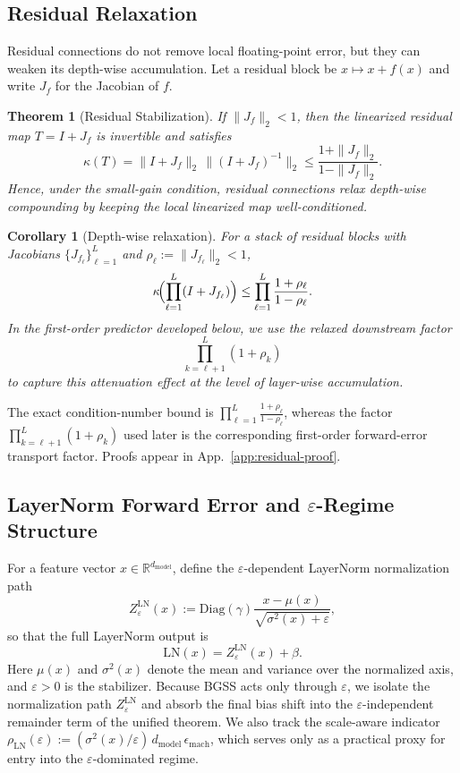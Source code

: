 \documentclass[twoside]{article}
\newtheorem{theorem}{Theorem}
\newtheorem{corollary}{Corollary}
\theoremstyle{definition}
\theoremstyle{remark}
\begin{document}
\subsection{Residual Relaxation}
\label{subsec:residual}

Residual connections do not remove local floating-point error, but they can
weaken its depth-wise accumulation. Let a residual block be $x \mapsto x + f(x)$
and write $J_f$ for the Jacobian of $f$.

\begin{theorem}[Residual Stabilization]
\label{thm:residual}
If $\|J_f\|_2 < 1$, then the linearized residual map $T = I + J_f$ is invertible and satisfies
\[
\kappa(T)
=
\|I+J_f\|_2\,\|(I+J_f)^{-1}\|_2
\le
\frac{1+\|J_f\|_2}{1-\|J_f\|_2}.
\]
Hence, under the small-gain condition, residual connections relax depth-wise compounding by
keeping the local linearized map well-conditioned.
\end{theorem}

\begin{corollary}[Depth-wise relaxation]
\label{cor:depth}
For a stack of residual blocks with Jacobians $\{J_{f_\ell}\}_{\ell=1}^L$ and
$\rho_\ell := \|J_{f_\ell}\|_2 < 1$,
\[
\kappa\!\Bigl(\prod_{\ell=1}^L (I+J_{f_\ell})\Bigr)
\le
\prod_{\ell=1}^L \frac{1+\rho_\ell}{1-\rho_\ell}.
\]
In the first-order predictor developed below, we use the relaxed downstream factor
\[
\prod_{k=\ell+1}^L (1+\rho_k)
\]
to capture this attenuation effect at the level of layer-wise accumulation.
\end{corollary}

The exact condition-number bound is
$\prod_{\ell=1}^L \frac{1+\rho_\ell}{1-\rho_\ell}$, whereas the factor
$\prod_{k=\ell+1}^L (1+\rho_k)$ used later is the corresponding first-order
forward-error transport factor. Proofs appear in
App.~\ref{app:residual-proof}.

\subsection{LayerNorm Forward Error and \texorpdfstring{$\varepsilon$}{epsilon}-Regime Structure}
\label{subsec:ln}

For a feature vector $x \in \mathbb{R}^{d_{\mathrm{model}}}$, define the
$\varepsilon$-dependent LayerNorm normalization path
\[
Z^{\mathrm{LN}}_\varepsilon(x)
:=
\mathrm{Diag}(\gamma)\frac{x-\mu(x)}{\sqrt{\sigma^2(x)+\varepsilon}},
\]
so that the full LayerNorm output is
\[
\mathrm{LN}(x)=Z^{\mathrm{LN}}_\varepsilon(x)+\beta.
\]
Here $\mu(x)$ and $\sigma^2(x)$ denote the mean and variance over the normalized
axis, and $\varepsilon > 0$ is the stabilizer. Because BGSS acts only through
$\varepsilon$, we isolate the normalization path
$Z^{\mathrm{LN}}_\varepsilon$ and absorb the final bias shift into the
$\varepsilon$-independent remainder term of the unified theorem. We also track
the scale-aware indicator
$\rho_{\mathrm{LN}}(\varepsilon):=(\sigma^2(x)/\varepsilon)\,
d_{\mathrm{model}}\,\epsilon_{\mathrm{mach}}$, which serves only as a practical
proxy for entry into the $\varepsilon$-dominated regime.
\end{document}
